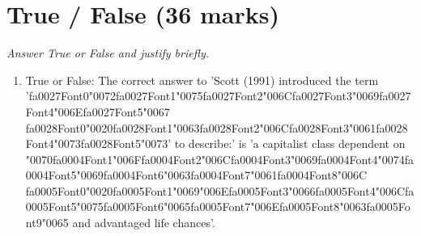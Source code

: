 \documentclass[12pt]{article}
\begin{document}
\section*{True / False (36 marks)}
\textit{Answer True or False and justify briefly.}
\begin{enumerate}[label=\arabic*.]
\item True or False: The correct answer to 'Scott (1991) introduced the term '{\csname fa0027Font0\endcsname\char"0072}{\csname fa0027Font1\endcsname\char"0075}{\csname fa0027Font2\endcsname\char"006C}{\csname fa0027Font3\endcsname\char"0069}{\csname fa0027Font4\endcsname\char"006E}{\csname fa0027Font5\endcsname\char"0067} {\csname fa0028Font0\endcsname\char"0020}{\csname fa0028Font1\endcsname\char"0063}{\csname fa0028Font2\endcsname\char"006C}{\csname fa0028Font3\endcsname\char"0061}{\csname fa0028Font4\endcsname\char"0073}{\csname fa0028Font5\endcsname\char"0073}' to describe:' is 'a capitalist class dependent on {\char"0070}{\csname fa0004Font1\endcsname\char"006F}{\csname fa0004Font2\endcsname\char"006C}{\csname fa0004Font3\endcsname\char"0069}{\csname fa0004Font4\endcsname\char"0074}{\csname fa0004Font5\endcsname\char"0069}{\csname fa0004Font6\endcsname\char"0063}{\csname fa0004Font7\endcsname\char"0061}{\csname fa0004Font8\endcsname\char"006C} {\csname fa0005Font0\endcsname\char"0020}{\csname fa0005Font1\endcsname\char"0069}{\char"006E}{\csname fa0005Font3\endcsname\char"0066}{\csname fa0005Font4\endcsname\char"006C}{\csname fa0005Font5\endcsname\char"0075}{\csname fa0005Font6\endcsname\char"0065}{\csname fa0005Font7\endcsname\char"006E}{\csname fa0005Font8\endcsname\char"0063}{\csname fa0005Font9\endcsname\char"0065} and advantaged life chances'.

\end{enumerate}
\end{document}
